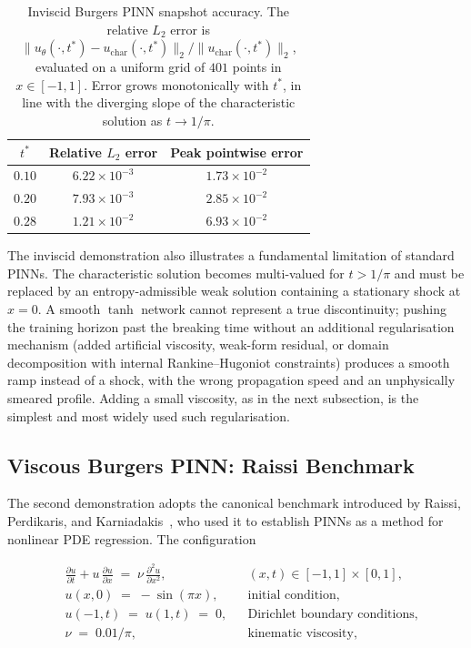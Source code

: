 \documentclass[11pt,a4paper]{report}
\begin{document}
\begin{table}[h!]
\centering
\small
\caption{Inviscid Burgers PINN snapshot accuracy. The relative $L_{2}$ error is $\|u_{\theta}(\cdot, t^{*}) - u_{\mathrm{char}}(\cdot, t^{*})\|_{2} / \|u_{\mathrm{char}}(\cdot, t^{*})\|_{2}$, evaluated on a uniform grid of $401$ points in $x \in [-1, 1]$. Error grows monotonically with $t^{*}$, in line with the diverging slope of the characteristic solution as $t \to 1/\pi$.}
\label{tab:burgers_inviscid_errors}
\begin{tabular}{c c c}
\toprule
$t^{*}$ & Relative $L_{2}$ error & Peak pointwise error \\
\midrule
$0.10$ & $6.22 \times 10^{-3}$ & $1.73 \times 10^{-2}$ \\
$0.20$ & $7.93 \times 10^{-3}$ & $2.85 \times 10^{-2}$ \\
$0.28$ & $1.21 \times 10^{-2}$ & $6.93 \times 10^{-2}$ \\
\bottomrule
\end{tabular}
\end{table}

The inviscid demonstration also illustrates a fundamental limitation of standard PINNs. The characteristic solution becomes multi-valued for $t > 1/\pi$ and must be replaced by an entropy-admissible weak solution containing a stationary shock at $x = 0$. A smooth $\tanh$ network cannot represent a true discontinuity; pushing the training horizon past the breaking time without an additional regularisation mechanism (added artificial viscosity, weak-form residual, or domain decomposition with internal Rankine--Hugoniot constraints) produces a smooth ramp instead of a shock, with the wrong propagation speed and an unphysically smeared profile. Adding a small viscosity, as in the next subsection, is the simplest and most widely used such regularisation.

\subsection{Viscous Burgers PINN: Raissi Benchmark}
\label{sec:burgers_reference}

The second demonstration adopts the canonical benchmark introduced by Raissi, Perdikaris, and Karniadakis~\cite{Raissi2019PINN}, who used it to establish PINNs as a method for nonlinear PDE regression. The configuration

\begin{equation}
\label{eq:burgers_setup}
\begin{aligned}
&\frac{\partial u}{\partial t} + u\,\frac{\partial u}{\partial x} \;=\; \nu\,\frac{\partial^{2} u}{\partial x^{2}},
&& (x, t) \in [-1, 1] \times [0, 1], \\[0.5ex]
&u(x, 0) \;=\; -\sin(\pi x),
&& \text{initial condition}, \\[0.5ex]
&u(-1, t) \;=\; u(1, t) \;=\; 0,
&& \text{Dirichlet boundary conditions}, \\[0.5ex]
&\nu \;=\; 0.01/\pi,
&& \text{kinematic viscosity},
\end{aligned}
\end{equation}
\end{document}
